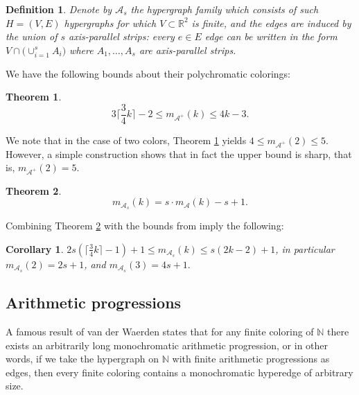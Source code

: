 \documentclass[11pt,oneside]{amsart}
\newcommand{\R}{\mathbb{R}}
\newcommand{\A}{\mathcal{A}}
\newtheorem{theorem}{Theorem}
\newtheorem{corollary}{Corollary}
\newtheorem{definition}{Definition}
\begin{document}
\begin{definition} Denote by $\A_s$ the hypergraph family which consists of such $H=(V,E)$ hypergraphs for which $V\subset \R^2$ is finite, and the edges are induced by the union of $s$ axis-parallel strips: every $e\in E$ edge can be written in the form $V\cap \Big(\cup_{i=1}^s A_i\Big)$ where $A_1,\ldots, A_s$ are axis-parallel strips. 
\end{definition}

We have the following bounds about their polychromatic colorings:


\begin{theorem}\label{kereszt}
$$3\bigg\lceil \frac{3}{4}k\bigg\rceil -2\le m_{\A^+}(k)\le 4k-3.$$
\end{theorem}

We note that in the case of two colors, Theorem \ref{kereszt} yields $4\le m_{\A^+}(2)\le5$. However, a simple construction shows that in fact the upper bound is sharp, that is, $m_{\A^+}(2)=5$.



\begin{theorem}\label{s_strip}
$$m_{\A_s}(k)=s \cdot m_\A(k)-s+1.$$
\end{theorem}

Combining Theorem \ref{s_strip} with the bounds from \cite{apstrip} imply the following:

\begin{corollary}
$2s(\lceil \frac{3}{4} k\rceil-1)+1\le m_{\A_s}(k)\le s(2k-2)+1$, in particular $m_{\A_s}(2)=2s+1$, and $m_{\A_s}(3)=4s+1.$
\end{corollary}

\subsection{Arithmetic progressions}

A famous result of van der Waerden states that for any finite coloring of $\mathbb{N}$ there exists an arbitrarily long monochromatic arithmetic progression, or in other words, if we take the hypergraph on $\mathbb{N}$ with finite arithmetic progressions as edges, then every finite coloring contains a monochromatic hyperedge of arbitrary size.
\end{document}
